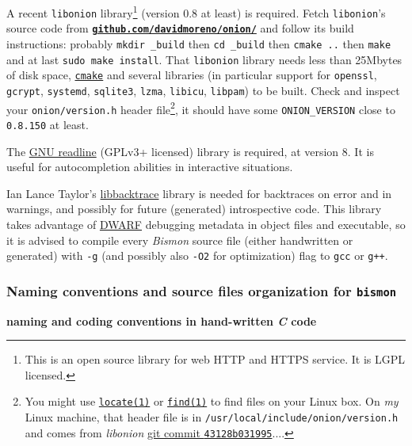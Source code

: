 A recent \texttt{libonion} library\footnote{This is an open source
  library for web HTTP and HTTPS service. It is LGPL licensed.}
(version 0.8 at least) is required. Fetch \texttt{libonion}'s source
code from
\href{https://github.com/davidmoreno/onion}{\texttt{\textbf{github.com/davidmoreno/onion/}}}
and follow its build instructions: probably \texttt{mkdir \_build} then
\texttt{cd \_build} then \texttt{cmake ..} then \texttt{make} and at
last \texttt{sudo make install}. That \texttt{libonion} library needs
less than 25Mbytes of disk space,
\href{https://cmake.org}{\texttt{cmake}} and several libraries (in
particular support for \texttt{openssl}, \texttt{gcrypt},
\texttt{systemd}, \texttt{sqlite3}, \texttt{lzma}, \texttt{libicu},
\texttt{libpam}) to be built. Check and inspect your
\texttt{onion/version.h} header file\footnote{You might use
  \href{https://man7.org/linux/man-pages/man1/locate.1.html}{\texttt{locate(1)}}
  or
  \href{https://man7.org/linux/man-pages/man1/find.1.html}{\texttt{find(1)}}
  to find files on your Linux box. On \emph{my} Linux machine, that
  header file is in \texttt{/usr/local/include/onion/version.h} and
  comes from \emph{libonion}
  \href{https://github.com/davidmoreno/onion/commit/43128b03199518d4878074c311ff71ff0018aea8}{git
    commit \texttt{43128b031995}}....}, it should have some
\texttt{ONION\_VERSION} close to \texttt{0.8.150} at least.

The \href{https://www.gnu.org/software/readline/}{GNU readline}
(GPLv3+ licensed) library is required, at version 8. It is useful for
autocompletion abilities in interactive situations.

Ian Lance Taylor's
\href{https://github.com/ianlancetaylor/libbacktrace}{libbacktrace}
library is needed for backtraces on error and in warnings, and
possibly for future (generated) introspective code. This library takes
advantage of \href{https://en.wikipedia.org/wiki/DWARF}{DWARF}
debugging metadata in object files and executable, so it is advised to
compile every \emph{Bismon} source file (either handwritten or
generated) with \texttt{-g} (and possibly also \texttt{-O2} for
optimization) flag to \texttt{gcc} or \texttt{g++}.

\subsubsection{Naming conventions and source files organization for \texttt{bismon}}

\medskip

{\large \textbf{naming and coding conventions in hand-written \emph{C} code}}


